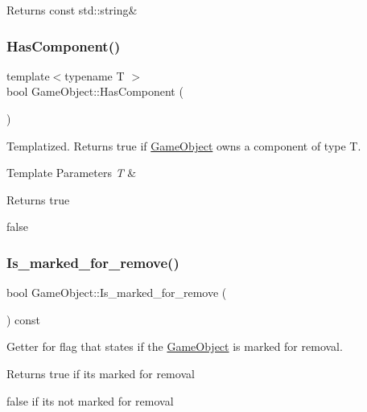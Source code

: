 \begin{DoxyReturn}{Returns}
const std\+::string\& 
\end{DoxyReturn}
\mbox{\label{classGameObject_ace5e8a7bdb6bf548b534cae696ed0db1}} 
\subsubsection{\texorpdfstring{Has\+Component()}{HasComponent()}}
{\footnotesize\ttfamily template$<$typename T $>$ \\
bool Game\+Object\+::\+Has\+Component (\begin{DoxyParamCaption}{ }\end{DoxyParamCaption})}



Templatized. Returns true if \hyperlink{classGameObject}{Game\+Object} owns a component of type T. 


\begin{DoxyTemplParams}{Template Parameters}
{\em T} & \\
\hline
\end{DoxyTemplParams}
\begin{DoxyReturn}{Returns}
true 

false 
\end{DoxyReturn}
\mbox{\label{classGameObject_a812be3286e6e8d3839c844c507093395}} 
\subsubsection{\texorpdfstring{Is\+\_\+marked\+\_\+for\+\_\+remove()}{Is\_marked\_for\_remove()}}
{\footnotesize\ttfamily bool Game\+Object\+::\+Is\+\_\+marked\+\_\+for\+\_\+remove (\begin{DoxyParamCaption}{ }\end{DoxyParamCaption}) const}



Getter for flag that states if the \hyperlink{classGameObject}{Game\+Object} is marked for removal. 

\begin{DoxyReturn}{Returns}
true if its marked for removal 

false if it\textquotesingle{}s not marked for removal 
\end{DoxyReturn}
\mbox{\label{classGameObject_a6fbe224c7ecc5562df50fccbaae30658}} 
